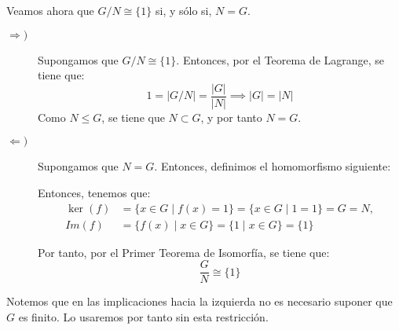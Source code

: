 \begin{ejercicio}
    Veamos ahora que $G/N\cong \{1\}$ si, y sólo si, $N=G$.
    \begin{description}
        \item[$\Longrightarrow)$] Supongamos que $G/N\cong \{1\}$. Entonces, por el Teorema de Lagrange, se tiene que:
        \begin{equation*}
            1 = |G/N| = \dfrac{|G|}{|N|} \implies |G|=|N|
        \end{equation*}
        Como $N\leq G$, se tiene que $N\subset G$, y por tanto $N=G$.

        \item[$\Longleftarrow)$] Supongamos que $N=G$. Entonces, definimos el homomorfismo siguiente:

        Entonces, tenemos que:
        \begin{align*}
            \ker(f) &= \{x\in G\mid f(x)=1\} = \{x\in G\mid 1=1\} = G = N,\\
            Im(f) &= \{f(x)\mid x\in G\} = \{1\mid x\in G\} = \{1\}
        \end{align*}

        Por tanto, por el Primer Teorema de Isomorfía, se tiene que:
        \begin{equation*}
            \dfrac{G}{N}\cong \{1\}
        \end{equation*}
    \end{description}
    \begin{observacion}
        Notemos que en las implicaciones hacia la izquierda no es necesario suponer que $G$ es finito. Lo usaremos por tanto sin esta restricción.
    \end{observacion}
\end{ejercicio}


